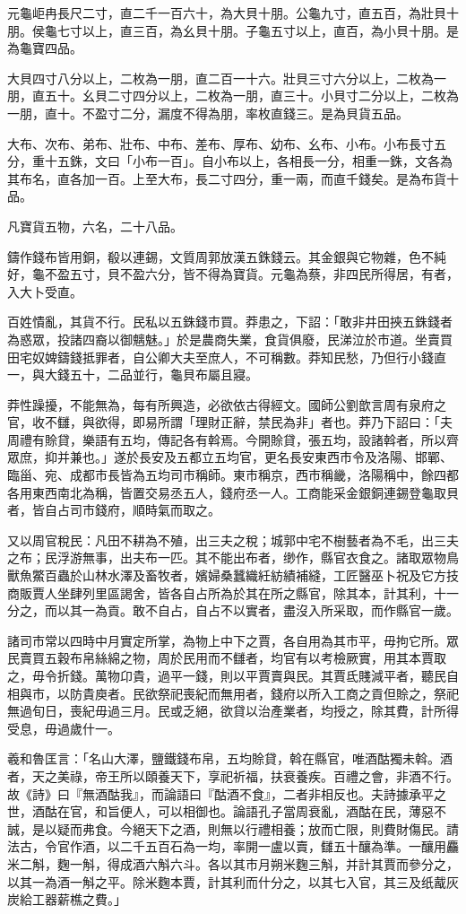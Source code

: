 \begin{pinyinscope}
元龜岠冉長尺二寸，直二千一百六十，為大貝十朋。公龜九寸，直五百，為壯貝十朋。侯龜七寸以上，直三百，為幺貝十朋。子龜五寸以上，直百，為小貝十朋。是為龜寶四品。

大貝四寸八分以上，二枚為一朋，直二百一十六。壯貝三寸六分以上，二枚為一朋，直五十。幺貝二寸四分以上，二枚為一朋，直三十。小貝寸二分以上，二枚為一朋，直十。不盈寸二分，漏度不得為朋，率枚直錢三。是為貝貨五品。

大布、次布、弟布、壯布、中布、差布、厚布、幼布、幺布、小布。小布長寸五分，重十五銖，文曰「小布一百」。自小布以上，各相長一分，相重一銖，文各為其布名，直各加一百。上至大布，長二寸四分，重一兩，而直千錢矣。是為布貨十品。

凡寶貨五物，六名，二十八品。

鑄作錢布皆用銅，殽以連錫，文質周郭放漢五銖錢云。其金銀與它物雜，色不純好，龜不盈五寸，貝不盈六分，皆不得為寶貨。元龜為蔡，非四民所得居，有者，入大卜受直。

百姓憒亂，其貨不行。民私以五銖錢市買。莽患之，下詔：「敢非井田挾五銖錢者為惑眾，投諸四裔以御魑魅。」於是農商失業，食貨俱廢，民涕泣於市道。坐賣買田宅奴婢鑄錢抵罪者，自公卿大夫至庶人，不可稱數。莽知民愁，乃但行小錢直一，與大錢五十，二品並行，龜貝布屬且寢。

莽性躁擾，不能無為，每有所興造，必欲依古得經文。國師公劉歆言周有泉府之官，收不讎，與欲得，即易所謂「理財正辭，禁民為非」者也。莽乃下詔曰：「夫周禮有賒貸，樂語有五均，傳記各有斡焉。今開賒貸，張五均，設諸斡者，所以齊眾庶，抑并兼也。」遂於長安及五都立五均官，更名長安東西市令及洛陽、邯鄲、臨甾、宛、成都市長皆為五均司市稱師。東市稱京，西市稱畿，洛陽稱中，餘四都各用東西南北為稱，皆置交易丞五人，錢府丞一人。工商能采金銀銅連錫登龜取貝者，皆自占司市錢府，順時氣而取之。

又以周官稅民：凡田不耕為不殖，出三夫之稅；城郭中宅不樹藝者為不毛，出三夫之布；民浮游無事，出夫布一匹。其不能出布者，缈作，縣官衣食之。諸取眾物鳥獸魚鱉百蟲於山林水澤及畜牧者，嬪婦桑蠶織紝紡績補縫，工匠醫巫卜祝及它方技商販賈人坐肆列里區謁舍，皆各自占所為於其在所之縣官，除其本，計其利，十一分之，而以其一為貢。敢不自占，自占不以實者，盡沒入所采取，而作縣官一歲。

諸司市常以四時中月實定所掌，為物上中下之賈，各自用為其市平，毋拘它所。眾民賣買五穀布帛絲綿之物，周於民用而不讎者，均官有以考檢厥實，用其本賈取之，毋令折錢。萬物卬貴，過平一錢，則以平賈賣與民。其賈氐賤減平者，聽民自相與市，以防貴庾者。民欲祭祀喪紀而無用者，錢府以所入工商之貢但賒之，祭祀無過旬日，喪紀毋過三月。民或乏絕，欲貸以治產業者，均授之，除其費，計所得受息，毋過歲什一。

羲和魯匡言：「名山大澤，鹽鐵錢布帛，五均賒貸，斡在縣官，唯酒酤獨未斡。酒者，天之美祿，帝王所以頤養天下，享祀祈福，扶衰養疾。百禮之會，非酒不行。故《詩》曰『無酒酤我』，而論語曰『酤酒不食』，二者非相反也。夫詩據承平之世，酒酤在官，和旨便人，可以相御也。論語孔子當周衰亂，酒酤在民，薄惡不誠，是以疑而弗食。今絕天下之酒，則無以行禮相養；放而亡限，則費財傷民。請法古，令官作酒，以二千五百石為一均，率開一盧以賣，讎五十釀為準。一釀用麤米二斛，麴一斛，得成酒六斛六斗。各以其市月朔米麴三斛，并計其賈而參分之，以其一為酒一斛之平。除米麴本賈，計其利而什分之，以其七入官，其三及纸酨灰炭給工器薪樵之費。」


\end{pinyinscope}

